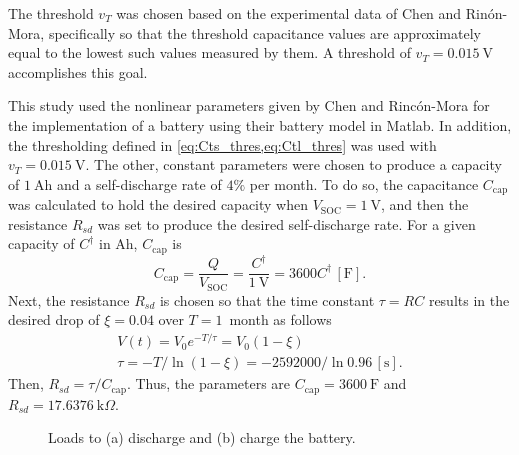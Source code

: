 \documentclass[../zhang_thesis.tex]{subfiles}
\begin{document}
The threshold $v_T$ was chosen based on the experimental data of Chen and Rin\'on-Mora, specifically so that the threshold capacitance values are approximately equal to the lowest such values measured by them. A threshold of $v_T=0.015~\mathrm{V}$ accomplishes this goal.

This study used the nonlinear parameters given by Chen and Rinc\'on-Mora for the implementation of a battery using their battery model in Matlab. In addition, the thresholding defined in \cref{eq:Cts_thres,eq:Ctl_thres} was used with $v_T=0.015~\mathrm{V}$. The other, constant parameters were chosen to produce a capacity of $1~\mathrm{Ah}$ and a self-discharge rate of $4\%$ per month. To do so, the capacitance $C_\text{cap}$ was calculated to hold the desired capacity
when $V_\text{SOC}=1~\mathrm{V}$, and then the resistance $R_{sd}$ was set to produce the desired self-discharge rate. For a given capacity of $C^\dag$ in Ah, $C_\text{cap}$ is
\begin{equation}
    C_\text{cap} = \frac{Q}{V_\text{SOC}} = \frac{C^\dag}{1~\text{V}} = 3600 C^\dag \,[\text{F}].
\end{equation}
Next, the resistance $R_{sd}$ is chosen so that the time constant $\tau=RC$ results in the desired drop of $\xi=0.04$ over $T=1$~month as follows
\begin{gather}
    V(t) = V_0 e^{-T/\tau} = V_0 (1-\xi) \\
    \tau = -T/\ln(1-\xi) = -2592000/\ln 0.96 \,[\text{s}].
\end{gather}
Then, $R_{sd}=\tau/C_\text{cap}$. Thus, the parameters are $C_\text{cap}=3600~\mathrm{F}$ and $R_{sd}=17.6376~\mathrm{k}\Omega$.

\begin{figure}[b]
\centering
\begin{subfigure}[b]{0.4\textwidth}
    \centering
    \vspace{1.1cm}
    \caption{}
\end{subfigure}
\hfill
\begin{subfigure}[b]{0.55\textwidth}
    \centering
    \caption{}
\end{subfigure}
\caption{Loads to (a) discharge and (b) charge the battery.}
\label{fig:batt_loads}
\end{figure}
\end{document}
